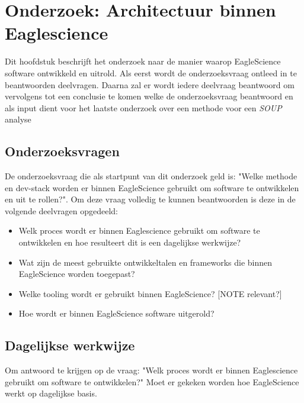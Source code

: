 \chapter{Onderzoek: Architectuur binnen Eaglescience}\label{ch:onderzoek:-architectuur-binnen-eaglescience}

Dit hoofdstuk beschrijft het onderzoek naar de manier waarop EagleScience software ontwikkeld en uitrold. Als eerst wordt de onderzoeksvraag ontleed in te beantwoorden deelvragen. Daarna zal er wordt iedere deelvraag beantwoord om vervolgens tot een conclusie te komen welke de onderzoeksvraag beantwoord en als input dient voor het laatste onderzoek over een methode voor een \textit{SOUP} analyse

\section{Onderzoeksvragen}\label{sec:ESOnderzoeksVraag}
De onderzoeksvraag die als startpunt van dit onderzoek geld is: "Welke methode en dev-stack worden er binnen EagleScience gebruikt om software te ontwikkelen en uit te rollen?". Om deze vraag volledig te kunnen beantwoorden is deze in de volgende deelvragen opgedeeld:
\begin{itemize}
    \item Welk proces wordt er binnen Eaglescience gebruikt om software te ontwikkelen en hoe resulteert dit is een dagelijkse werkwijze?
    \item Wat zijn de meest gebruikte ontwikkeltalen en frameworks die binnen EagleScience worden toegepast?
    \item Welke tooling wordt er gebruikt binnen EagleScience? [NOTE relevant?]
    \item Hoe wordt er binnen EagleScience software uitgerold?
\end{itemize}


\section{Dagelijkse werkwijze}\label{sec:dagelijkse-werkwijze}
Om antwoord te krijgen op de vraag: "Welk proces wordt er binnen Eaglescience gebruikt om software te ontwikkelen?" Moet er gekeken worden hoe EagleScience werkt op dagelijkse basis.

